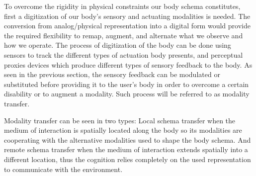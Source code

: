 To overcome the rigidity in physical constraints our body schema constitutes, first a digitization of our body's sensory and actuating modalities is needed. The conversion from analog/physical representation into a digital form would provide the required flexibility to remap, augment, and alternate what we observe and how we operate. The process of digitization of the body can be done using sensors to track the different types of actuation body presents, and perceptual proxies devices which produce different types of sensory feedback to the body. As seen in the previous section, the sensory feedback can be modulated or substituted before providing it to the user's body in order to overcome a certain disability or to augment a modality. Such process will be referred to as modality transfer.

Modality transfer can be seen in two types: Local schema transfer when the medium of interaction is spatially located along the body so its modalities are cooperating with the alternative modalities used to shape the body schema. And remote schema transfer when the medium of interaction extends spatially into a different location, thus the cognition relies completely on the used representation to communicate with the environment. 

